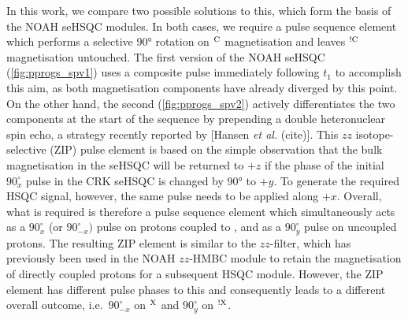 \documentclass[11pt]{article}
\newcommand*{\hl}[1]{\textcolor{WildStrawberry}{#1}}
\newcommand*{\carbon}{\ce{^{13}C}}
\newcommand*{\proton}{\ce{^{1}H}}
\newcommand*{\magn}[1]{\ce{^1H}$^{#1}$}
\newcommand*{\magnnot}[1]{\ce{^1H}$^{!#1}$}
\begin{document}
\hl{
In this work, we compare two possible solutions to this, which form the basis of the NOAH seHSQC modules.
In both cases, we require a pulse sequence element which performs a selective \ang{90} rotation on \magn{\ce{C}} magnetisation and leaves \magnnot{\ce{C}} magnetisation untouched.
The first version of the NOAH seHSQC (\cref{fig:pprogs_spv1}) uses a composite \proton{} pulse immediately following $t_1$ to accomplish this aim, as both magnetisation components have already diverged by this point.
On the other hand, the second (\cref{fig:pprogs_spv2}) actively differentiates the two components at the start of the sequence by prepending a double heteronuclear spin echo, a strategy recently reported by [Hansen \textit{et al.} (cite)].
This $zz$ isotope-selective (ZIP) pulse element is based on the simple observation that the bulk magnetisation in the seHSQC will be returned to $+z$ if the phase of the initial \proton{} $90^\circ_{x}$ pulse in the CRK seHSQC is changed by \ang{90} to $+y$.
To generate the required HSQC signal, however, the same pulse needs to be applied along $+x$.
Overall, what is required is therefore a pulse sequence element which simultaneously acts as a $90^\circ_x$ (or $90^\circ_{-x})$ pulse on protons coupled to \carbon{}, and as a $90^\circ_y$ pulse on uncoupled protons.
The resulting ZIP element is similar to the $zz$-filter, which has previously been used in the NOAH $zz$-HMBC module to retain the magnetisation of directly coupled protons for a subsequent HSQC module.\autocite{Kupce2018CC, Kupce2019JMR}
However, the ZIP element has different pulse phases to this and consequently leads to a different overall outcome, i.e.\ $90^\circ_{-x}$ on \magn{\ce{X}} and $90^\circ_y$ on \magnnot{\ce{X}}.
}
\end{document}
